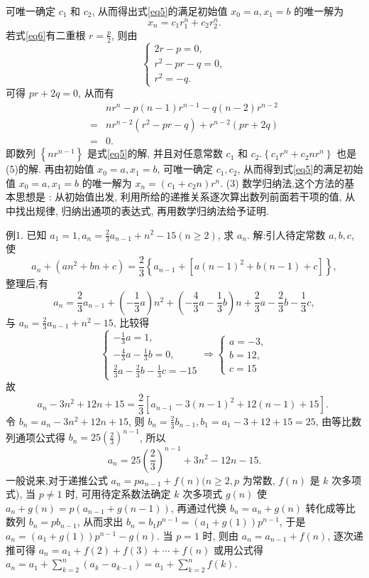 可唯一确定 $c_1$ 和 $c_2$, 从而得出式\ref{eq5}的满足初始值 $x_0=a, x_1=b$ 的唯一解为
$$
x_n=c_1 r_1^n+c_2 r_2^n .
$$
若式\ref{eq6}有二重根 $r=\frac{p}{2}$, 则由
$$
\left\{\begin{array}{l}
2 r-p=0, \\
r^2-p r-q=0, \\
r^2=-q .
\end{array}\right.
$$
可得 $p r+2 q=0$, 从而有
$$
\begin{aligned}
& n r^n-p(n-1) r^{n-1}-q(n-2) r^{n-2} \\
= & n r^{n-2}\left(r^2-p r-q\right)+r^{n-2}(p r+2 q) \\
= & 0 .
\end{aligned}
$$
即数列 $\left\{n r^{n-1}\right\}$ 是式\ref{eq5}的解, 并且对任意常数 $c_1$ 和 $c_2 .\left\{c_1 r^n+c_2 n r^n\right\}$ 也是(5)的解.
再由初始值 $x_0=a, x_1=b$, 可唯一确定 $c_1, c_2$, 从而得到式\ref{eq5}的满足初始值
$x_0=a, x_1=b$ 的唯一解为 $x_n=\left(c_1+c_2 n\right) r^n$.
(3) 数学归纳法,这个方法的基本思想是 : 从初始值出发, 利用所给的递推关系逐次算出数列前面若干项的值, 从中找出规律, 归纳出通项的表达式, 再用数学归纳法给予证明.



例1. 已知 $a_1=1, a_n=\frac{2}{3} a_{n-1}+n^2-15(n \geqslant 2)$, 求 $a_n$.
解:引人待定常数 $a, b, c$, 使
$$
a_n+\left(a n^2+b n+c\right)=\frac{2}{3}\left\{a_{n-1}+\left[a(n-1)^2+b(n-1)+c\right]\right\},
$$
整理后,有
$$
a_n=\frac{2}{3} a_{n-1}+\left(-\frac{1}{3} a\right) n^2+\left(-\frac{4}{3} a-\frac{1}{3} b\right) n+\frac{2}{3} a-\frac{2}{3} b-\frac{1}{3} c,
$$
与 $a_n=\frac{2}{3} a_{n-1}+n^2-15$, 比较得
$$
\left\{\begin{array} { l } 
{ - \frac { 1 } { 3 } a = 1 , } \\
{ - \frac { 4 } { 3 } a - \frac { 1 } { 3 } b = 0 , } \\
{ \frac { 2 } { 3 } a - \frac { 2 } { 3 } b - \frac { 1 } { 3 } c = - 1 5 }
\end{array} \Rightarrow \left\{\begin{array}{l}
a=-3, \\
b=12, \\
c=15
\end{array}\right.\right.
$$
故
$$
a_n-3 n^2+12 n+15=\frac{2}{3}\left[a_{n-1}-3(n-1)^2+12(n-1)+15\right] \text {. }
$$
令 $b_n=a_n-3 n^2+12 n+15$, 则 $b_n=\frac{2}{3} b_{n-1}, b_1=a_1-3+12+15=25$, 由等比数列通项公式得 $b_n=25\left(\frac{2}{3}\right)^{n-1}$, 所以
$$
a_n=25\left(\frac{2}{3}\right)^{n-1}+3 n^2-12 n-15 .
$$
一般说来,对于递推公式 $a_n=p a_{n-1}+f(n)(n \geqslant 2, p$ 为常数, $f(n)$ 是 $k$ 次多项式), 当 $p \neq 1$ 时, 可用待定系数法确定 $k$ 次多项式 $g(n)$ 使 $a_n+ g(n)=p\left(a_{n-1}+g(n-1)\right)$, 再通过代换 $b_n=a_n+g(n)$ 转化成等比数列 $b_n= p b_{n-1}$, 从而求出 $b_n=b_1 p^{n-1}=\left(a_1+g(1)\right) p^{n-1}$, 于是 $a_n=\left(a_1+g(1)\right) p^{n-1}- g(n)$. 当 $p=1$ 时, 则由 $a_n=a_{n-1}+f(n)$, 逐次递推可得 $a_n=a_1+f(2)+ f(3)+\cdots+f(n)$ 或用公式得 $a_n=a_1+\sum_{k=2}^n\left(a_k-a_{k-1}\right)=a_1+\sum_{k=2}^n f(k)$.



